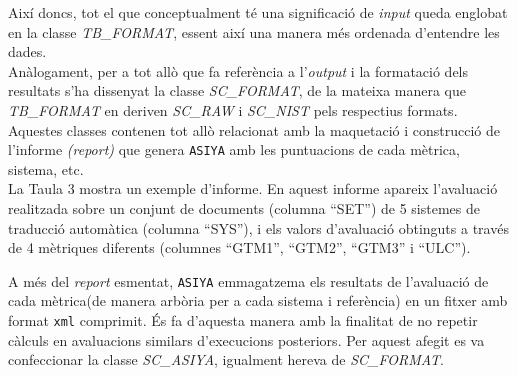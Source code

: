 \documentclass[11pt,a4paper]{article}
\begin{document}
Així doncs, tot el que conceptualment té una significació de \textit{input} queda englobat en la classe \textit{TB\_FORMAT}, essent així una manera més ordenada d'entendre les dades.
\\

Anàlogament, per a tot allò que fa referència a l'\textit{output} i la formatació dels resultats s'ha dissenyat la classe \textit{SC\_FORMAT}, de la mateixa manera que \textit{TB\_FORMAT} en deriven \textit{SC\_RAW} i \textit{SC\_NIST} pels respectius formats. Aquestes classes contenen tot allò relacionat amb la maquetació i construcció de l'informe \textit{(report)} que genera \texttt{ASIYA} amb les puntuacions de cada mètrica, sistema, etc.
\\

La Taula 3 mostra un exemple d'informe. En aquest informe apareix l'avaluació realitzada sobre un conjunt de documents (columna ``SET'') de 5 sistemes de traducció automàtica (columna ``SYS''), i els valors d'avaluació obtinguts a través de 4 mètriques diferents (columnes ``GTM1'', ``GTM2'', ``GTM3'' i ``ULC'').
\\

\begin{table}[H]
\end{table}

A més del \textit{report} esmentat, \texttt{ASIYA} emmagatzema els resultats de l'avaluació de cada mètrica(de manera arbòria per a cada sistema i referència) en un fitxer amb format \texttt{xml} comprimit. És fa d'aquesta manera amb la finalitat de no repetir càlculs en avaluacions similars d'execucions posteriors. Per aquest afegit es va confeccionar la classe \textit{SC\_ASIYA}, igualment hereva de \textit{SC\_FORMAT}.
\end{document}
